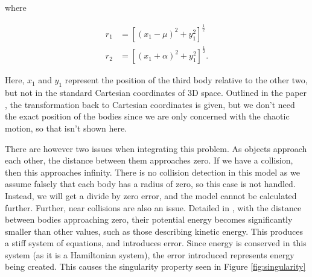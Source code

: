 \documentclass{article}
\begin{document}
where 

\begin{align}
    r_1 &= \left[(x_1 - \mu)^2 + y_1^2\right]^{\frac{1}{2}} \nonumber \\
    r_2 &= \left[(x_1 + \alpha)^2 + y_1^2\right]^{\frac{1}{2}}.
\end{align}

Here, $x_1$ and $y_1$ represent the position of the third body relative to the other two,
but not in the standard 
Cartesian coordinates of 3D space. Outlined in the paper \cite{eberle2007case}, the 
transformation back to Cartesian coordinates is given, but we don't need the exact 
position of the bodies since we are only concerned with the chaotic motion, so that isn't 
shown here.

There are however two issues when integrating this problem. As objects approach each
other, the distance between them 
approaches zero. If we have a collision, then this approaches infinity. There is no 
collision detection in this model as we assume falsely that each body has a radius of zero,
so this case is not handled. Instead, we will get a 
divide by zero error, and the model cannot be calculated further. Further, near collisions 
are also an issue. Detailed in \cite{chambers1999hybrid}, with the distance between bodies 
approaching zero, their potential energy becomes significantly smaller than other values, 
such as those describing kinetic energy. This 
produces a stiff system of equations, and introduces error. Since energy is conserved in
this system (as it is a Hamiltonian system), the error introduced represents energy being 
created. This causes the singularity property seen in Figure \ref{fig:singularity}
\end{document}
